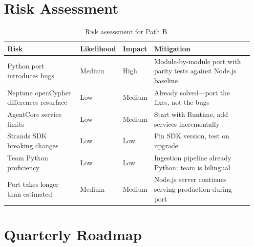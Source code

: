\documentclass[11pt,letterpaper]{article}
\begin{document}
\section{Risk Assessment}

\begin{table}[H]
\centering
\footnotesize
\begin{tabular}{@{}p{3.5cm}p{2cm}p{2cm}p{5.5cm}@{}}
\toprule
\textbf{Risk} & \textbf{Likelihood} & \textbf{Impact} & \textbf{Mitigation} \\
\midrule
Python port introduces bugs & Medium & High & Module-by-module port with parity tests against Node.js baseline \\
Neptune openCypher differences resurface & Low & Medium & Already solved---port the fixes, not the bugs \\
AgentCore service limits & Low & Medium & Start with Runtime, add services incrementally \\
Strands SDK breaking changes & Low & Low & Pin SDK version, test on upgrade \\
Team Python proficiency & Low & Low & Ingestion pipeline already Python; team is bilingual \\
Port takes longer than estimated & Medium & Medium & Node.js server continues serving production during port \\
\bottomrule
\end{tabular}
\caption{Risk assessment for Path B.}
\end{table}

\section{Quarterly Roadmap}
\end{document}
